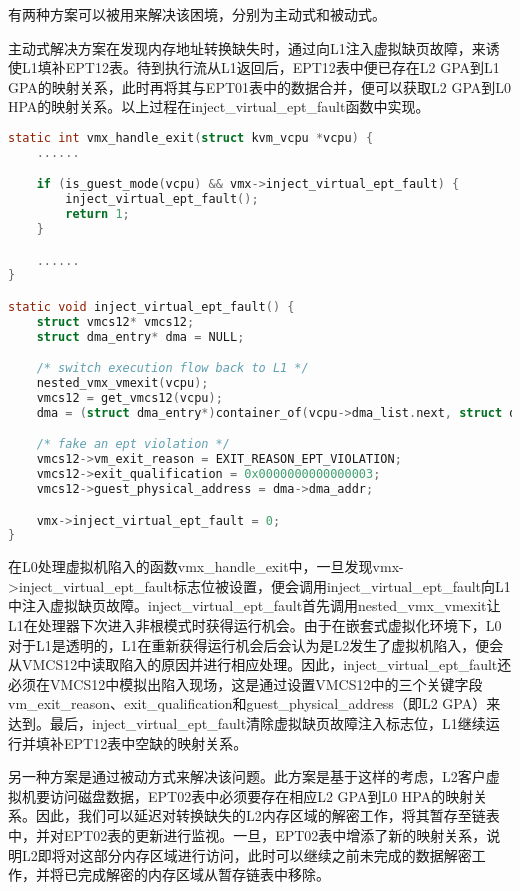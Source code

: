 有两种方案可以被用来解决该困境，分别为主动式和被动式。

主动式解决方案在发现内存地址转换缺失时，通过向L1注入虚拟缺页故障，来诱使L1填补EPT12表。待到执行流从L1返回后，EPT12表中便已存在L2 GPA到L1 GPA的映射关系，此时再将其与EPT01表中的数据合并，便可以获取L2 GPA到L0 HPA的映射关系。以上过程在inject\_virtual\_ept\_fault函数中实现。

\begin{lstlisting}[language={C}, caption={inject\_virtual\_ept\_fault实现源代码}]
static int vmx_handle_exit(struct kvm_vcpu *vcpu) {
	......

    if (is_guest_mode(vcpu) && vmx->inject_virtual_ept_fault) {
        inject_virtual_ept_fault();
        return 1;
    }

	......
}

static void inject_virtual_ept_fault() {	
    struct vmcs12* vmcs12;
    struct dma_entry* dma = NULL;

    /* switch execution flow back to L1 */
    nested_vmx_vmexit(vcpu);
    vmcs12 = get_vmcs12(vcpu);
    dma = (struct dma_entry*)container_of(vcpu->dma_list.next, struct dma_entry, next_entry);

    /* fake an ept violation */
    vmcs12->vm_exit_reason = EXIT_REASON_EPT_VIOLATION;
    vmcs12->exit_qualification = 0x0000000000000003;
    vmcs12->guest_physical_address = dma->dma_addr;

    vmx->inject_virtual_ept_fault = 0;
}
\end{lstlisting}

在L0处理虚拟机陷入的函数vmx\_handle\_exit中，一旦发现vmx->inject\_vi\-rtual\_ept\_fault标志位被设置，便会调用inject\_virtual\_ept\_fault向L1中注入虚拟缺页故障。inject\_virtual\_ept\_fault首先调用nested\_vmx\_vmexit让L1在处理器下次进入非根模式时获得运行机会。由于在嵌套式虚拟化环境下，L0对于L1是透明的，L1在重新获得运行机会后会认为是L2发生了虚拟机陷入，便会从VMCS12中读取陷入的原因并进行相应处理。因此，inject\_virtual\_ept\_fault还必须在VMCS12中模拟出陷入现场，这是通过设置VMCS12中的三个关键字段vm\_exit\_reason、exit\_qualification和guest\_physical\_address（即L2 GPA）来达到。最后，inject\_virtual\_ept\_fault清除虚拟缺页故障注入标志位，L1继续运行并填补EPT12表中空缺的映射关系。

另一种方案是通过被动方式来解决该问题。此方案是基于这样的考虑，L2客户虚拟机要访问磁盘数据，EPT02表中必须要存在相应L2 GPA到L0 HPA的映射关系。因此，我们可以延迟对转换缺失的L2内存区域的解密工作，将其暂存至链表中，并对EPT02表的更新进行监视。一旦，EPT02表中增添了新的映射关系，说明L2即将对这部分内存区域进行访问，此时可以继续之前未完成的数据解密工作，并将已完成解密的内存区域从暂存链表中移除。

